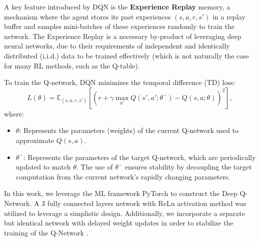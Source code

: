 \documentclass{article}
\begin{document}

A key feature introduced by DQN is the \textbf{Experience Replay} memory, a mechanism where the agent stores its past experiences \((s, a, r, s')\) in a replay buffer and samples mini-batches of these experiences randomly to train the network. The Experience Replay is a necessary by-product of leveraging deep neural networks, due to their requirements of independent and identically distributed (i.i.d.) data to be trained effectively (which is not naturally the case for many RL methods, such as the Q-table).

To train the Q-network, DQN minimizes the temporal difference (TD) loss:
\[
	L(\theta) = \mathbb{E}_{(s, a, r, s')} \left[ \left( r + \gamma \max_{a'} Q(s', a'; \theta^-) - Q(s, a; \theta) \right)^2 \right],
\]
where:
\begin{itemize}
	\item \(\theta\): Represents the parameters (weights) of the current Q-network used to approximate \(Q(s, a)\).
	\item \(\theta^-\): Represents the parameters of the target Q-network, which are periodically updated to match \(\theta\). The use of \(\theta^-\) ensures stability by decoupling the target computation from the current network’s rapidly changing parameters.
\end{itemize}

In this work, we leverage the ML framework PyTorch to construct the Deep Q-Network. A 3 fully connected layers network with ReLu activation method was utilized to leverage a simplistic design. Additionally, we incorporate a separate but identical network with delayed weight updates in order to stabilize the training of the Q-Network \cite{towardsdatascience_dqn}.
\end{document}
